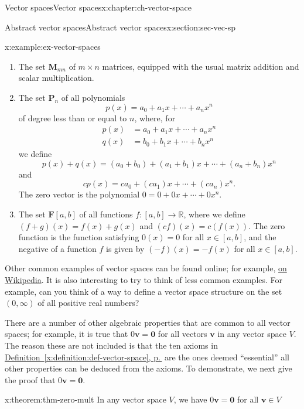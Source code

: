 \documentclass[oneside,10pt,]{book}
\newcommand{\xreffont}{\relax}
\numberwithin{equation}{section}
\newcommand{\R}{\mathbb{R}}
\newcommand{\vv}{\mathbf{v}}
\newcommand{\zer}{\mathbf{0}}
\newcommand{\amp}{&}
\begin{document}
\begin{chapterptx}{Vector spaces}{}{Vector spaces}{}{}{x:chapter:ch-vector-space}
\begin{sectionptx}{Abstract vector spaces}{}{Abstract vector spaces}{}{}{x:section:sec-vec-sp}
\begin{example}{}{x:example:ex-vector-spaces}
\begin{enumerate}
\item{}The set \(\mathbf{M}_{mn}\) of \(m\times n\) matrices, equipped with the usual matrix addition and scalar multiplication.%
\item{}The set \(\mathbf{P}_n\) of all polynomials%
\begin{equation*}
p(x) = a_0+a_1x+\cdots + a_nx^n
\end{equation*}
of degree less than or equal to \(n\), where, for%
\begin{align*}
p(x) \amp = a_0+a_1x+\cdots + a_nx^n \\
q(x) \amp = b_0+b_1x+\cdots +b_nx^n
\end{align*}
we define%
\begin{equation*}
p(x)+q(x)=(a_0+b_0)+(a_1+b_1)x+\cdots + (a_n+b_n)x^n
\end{equation*}
and%
\begin{equation*}
cp(x) = ca_0+(ca_1)x+\cdots + (ca_n)x^n\text{.}
\end{equation*}
The zero vector is the polynomial \(0=0+0x+\cdots + 0x^n\).%
\item{}The set \(\mathbf{F}[a,b]\) of all functions \(f:[a,b]\to \R\), where we define \((f+g)(x)=f(x)+g(x)\) and \((cf)(x)=c(f(x))\). The zero function is the function satisfying \(0(x)=0\) for all \(x\in [a,b]\), and the negative of a function \(f\) is given by \((-f)(x)=-f(x)\) for all \(x\in [a,b]\).%
\end{enumerate}
%
\end{example}
Other common examples of vector spaces can be found online; for example, \href{https://en.wikipedia.org/wiki/Examples_of_vector_spaces}{on Wikipedia}. It is also interesting to try to think of less common examples. For example, can you think of a way to define a vector space structure on the set \((0,\infty)\) of all positive real numbers?%
\par
There are a number of other algebraic properties that are common to all vector spaces; for example, it is true that \(0\vv = \zer\) for all vectors \(\vv\) in any vector space \(V\). The reason these are not included is that the ten axioms in \hyperref[x:definition:def-vector-space]{Definition~{\xreffont\ref{x:definition:def-vector-space}}, p.\,\pageref{x:definition:def-vector-space}} are the ones deemed ``essential'' \textendash{} all other properties can be deduced from the axioms. To demonstrate, we next give the proof that \(0\vv = \zer\).%
\begin{theorem}{}{}{x:theorem:thm-zero-mult}%
In any vector space \(V\), we have \(0\vv = \zer\) for all \(\vv\in V\)%

\end{theorem}
\end{sectionptx}
\end{chapterptx}
\end{document}

